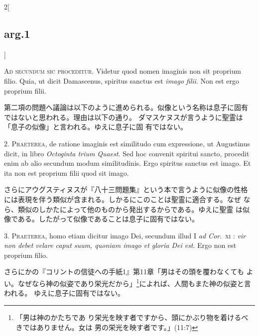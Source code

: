 \documentclass[paper=a4paper,fontsize=10pt,jafontsize=9pt,titlepage]{jlreq}
\begin{document}
\begin{paracol}{2}[\subsection{arg.1}]

{\scshape Ad secundum sic proceditur}. Videtur quod nomen imaginis non sit
proprium filio. Quia, ut dicit Damascenus, spiritus sanctus est {\itshape imago
filii}. Non est ergo proprium filii.

\switchcolumn

第二項の問題へ議論は以下のように進められる。似像という名称は息子に固有
 ではないと思われる。理由は以下の通り。
ダマスケヌスが言うように聖霊は「息子の似像」と言われる。ゆえに息子に固
 有ではない。


2. {\scshape Praeterea}, de ratione imaginis est similitudo cum expressione, ut
Augustinus dicit, in libro {\itshape Octoginta trium Quaest}. Sed hoc convenit
spiritui sancto, procedit enim ab alio secundum modum
similitudinis. Ergo spiritus sanctus est imago. Et ita non est
proprium filii quod sit imago.

\switchcolumn

さらにアウグスティヌスが『八十三問題集』という本で言うように似像の性格
 には表現を伴う類似が含まれる。しかるにこのことは聖霊に適合する。なぜ
 なら、類似のしかたによって他のものから発出するからである。ゆえに聖霊
 は似像である。したがって似像であることは息子に固有ではない。


3. {\scshape Praeterea}, homo etiam dicitur imago Dei, secundum illud
 I {\itshape ad Cor}.~{\scshape xi} : 
{\itshape vir non debet velare caput suum, quoniam imago et gloria Dei est}. Ergo
non est proprium filio.

\switchcolumn

さらにかの『コリントの信徒への手紙1』第11章「男はその頭を覆わなくても
 よい。なぜなら神の似姿であり栄光だから」\footnote{「男は神のかたちであ
 り栄光を映す者ですから、頭にかぶり物を着けるべきではありません。女は
 男の栄光を映す者です。」(11:7)}によれば、人間もまた神の似姿と言われる。
 ゆえに息子に固有ではない。


\end{paracol}
\end{document}
